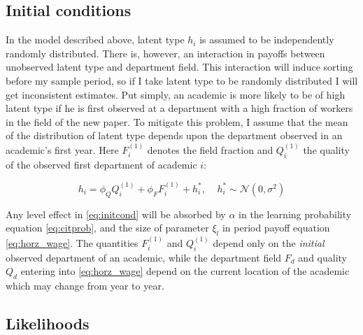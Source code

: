 \documentclass[]{article}
\begin{document}
\subsection{Initial conditions}
\label{sec:init_cond}

In the model described above, latent type $h_i$ is assumed to be
independently randomly distributed. There is, however, an interaction in
payoffs between unobserved latent type and department field.
This interaction will induce sorting before my sample period, so if I
take latent type to be randomly distributed I will get inconsistent
estimates. Put simply, an academic is more likely to be of high latent type if he is
first observed at a department with a high fraction of workers in the field of
the new paper. To mitigate this
problem, I assume that the mean of the distribution of latent
type depends upon the department observed in an academic's first year.  Here $F^{(1)}_i$ denotes the 
field fraction and $Q^{(1)}_i$ the quality of the observed first department of academic $i$:

\begin{equation}
    h_i = \phi_Q Q^{(1)}_i + \phi_F F^{(1)}_i + h^*_i, \ \ \ \ \  h^*_i \sim \mathcal{N}(0, \sigma^2)
    \label{eq:initcond}
\end{equation}

Any level effect in \eqref{eq:initcond} will be absorbed by $\alpha$ in the learning probability equation \eqref{eq:citprob}, and the size of parameter $\xi_l$ in period payoff equation \eqref{eq:horz_wage}. The quantities $F^{(1)}_i$ and $Q^{(1)}_i$ depend only on the \emph{initial} observed
department of an academic, while the department field $F_d$ and quality $Q_d$ entering
into \eqref{eq:horz_wage} depend on the current location of the academic which may change from year to year.

\subsection{Likelihoods}
\end{document}
